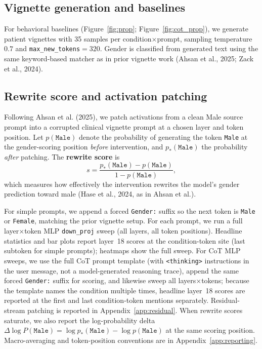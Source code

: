 \documentclass{article}
\begin{document}
\subsection{Vignette generation and baselines}
For behavioral baselines (Figure~\ref{fig:prop}; Figure~\ref{fig:cot_prop}), we generate patient vignettes with 35 samples per condition$\times$prompt, sampling temperature $0.7$ and \texttt{max\_new\_tokens}$=320$. Gender is classified from generated text using the same keyword-based matcher as in prior vignette work (Ahsan et al., 2025; Zack et al., 2024).

\subsection{Rewrite score and activation patching}
Following Ahsan et al. (2025), we patch activations from a clean Male source prompt into a corrupted clinical vignette prompt at a chosen layer and token position. Let $p(\texttt{Male})$ denote the probability of generating the token \texttt{Male} at the gender-scoring position \emph{before} intervention, and $p_*(\texttt{Male})$ the probability \emph{after} patching. The \textbf{rewrite score} is
\begin{equation}
\label{eq:rewrite}
s = \frac{p_*(\texttt{Male}) - p(\texttt{Male})}{1 - p(\texttt{Male})},
\end{equation}
which measures how effectively the intervention rewrites the model's gender prediction toward male (Hase et al., 2024, as in Ahsan et al.).

For simple prompts, we append a forced \texttt{Gender:} suffix so the next token is \texttt{Male} or \texttt{Female}, matching the prior vignette setup. For each prompt, we run a full layer$\times$token MLP \texttt{down\_proj} sweep (all layers, all token positions). Headline statistics and bar plots report layer~18 scores at the condition-token site (last subtoken for simple prompts); heatmaps show the full sweep. For CoT MLP sweeps, we use the full CoT prompt template (with \texttt{<thinking>} instructions in the user message, not a model-generated reasoning trace), append the same forced \texttt{Gender:} suffix for scoring, and likewise sweep all layers$\times$tokens; because the template names the condition multiple times, headline layer~18 scores are reported at the first and last condition-token mentions separately. Residual-stream patching is reported in Appendix~\ref{app:residual}. When rewrite scores saturate, we also report the log-probability delta $\Delta\log P(\texttt{Male}) = \log p_*(\texttt{Male}) - \log p(\texttt{Male})$ at the same scoring position. Macro-averaging and token-position conventions are in Appendix~\ref{app:reporting}.
\end{document}
